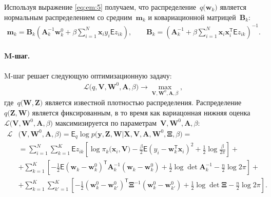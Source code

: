 Используя выражение \eqref{eq:em:5} получаем, что  распределение~$q\bigr(\mathbf{w}_{k}\bigr)$ является нормальным распределением со средним~$\mathbf{m}_{k}$ и ковариационной матрицей~$\mathbf{B}_k$:
\[
\label{eq:em:6}
\begin{aligned}
\mathbf{m}_{k} = \mathbf{B}_{k}\left(\mathbf{A}_{k}^{-1}\mathbf{w}_{k}^{0}+\beta\sum_{i=1}^{N}\mathbf{x}_{i}y_{i}\mathsf{E}z_{ik}\right), \qquad \mathbf{B}_{k} = \left(\mathbf{A}_{k}^{-1}+\beta\sum_{i=1}^{N}\mathbf{x}_{i}\mathbf{x}_{i}^{\mathsf{T}}\mathsf{E}z_{ik}\right)^{-1}.
\end{aligned}
\]

\paragraph{M-шаг.} M-шаг решает следующую оптимизационную задачу:
\[
\label{eq:em:new:3}
\begin{aligned}
\mathcal{L}\bigr(q, \textbf{V}, \textbf{W}^{0}, \textbf{A}, \beta\bigr) \to \max_{\textbf{V}, \textbf{W}^{0}, \textbf{A}, \beta},
\end{aligned}
\]
где~$q\bigr(\textbf{W}, \textbf{Z}\bigr)$ является известной плотностью распределения.
Распределение~$q\bigr(\mathbf{Z}, \mathbf{W}\bigr)$ является фиксированным, в то время как вариацонная нижняя оценка~$\mathcal{L}\bigr(\textbf{V}, \textbf{W}^{0}, \textbf{A}, \beta\bigr)$ максимизируется по параметрам~$\mathbf{V}, \mathbf{W}^0, \textbf{A},  \beta$:
\[
\label{eq:em:7}
\begin{aligned}
\mathcal{L}&\bigr(\textbf{V}, \textbf{W}^{0}, \textbf{A}, \beta\bigr) = \mathsf{E}_{q}\log p\bigr(\mathbf{y}, \mathbf{Z}, \mathbf{W}|\mathbf{X}, \mathbf{V}, \textbf{A}, \textbf{W}^{0}, \bm{\Xi}, \beta\bigr) =  \\
&= \sum_{i=1}^{N}\sum_{k=1}^{K}\mathsf{E}z_{ik}\left[\log\pi_k\bigr(\textbf{x}_i, \textbf{V}\bigr) - \frac{\beta}{2}\mathsf{E}\left(y_{i} - \textbf{w}_{k}^{\mathsf{T}}\textbf{x}_{i}\right)^{2} + \frac{1}{2}\log\frac{\beta}{2\pi}\right] +\\
&+ \sum_{k=1}^{K}\left[-\frac{1}{2}\mathsf{E}\left(\textbf{w}_{k} - \textbf{w}_{k}^{0}\right)^{\mathsf{T}}\textbf{A}_{k}^{-1}\left(\textbf{w}_{k} - \textbf{w}_{k}^{0}\right) + \frac{1}{2}\log\det\textbf{A}^{-1}_{k} - \frac{n}{2}\log2\pi\right] +\\
&+ \sum_{k=1}^{K}\sum_{k'=1}^{K}\left[-\frac{1}{2}\left(\textbf{w}_{k}^{0}-\textbf{w}_{k'}^{0}\right)^{\mathsf{T}}\bm{\Xi}^{-1}\left(\textbf{w}_{k}^{0}-\textbf{w}_{k'}^{0}\right) +\frac{1}{2}\log\det\bm{\Xi} -\frac{n}{2}\log{2\pi}\right].
\end{aligned}
\]
